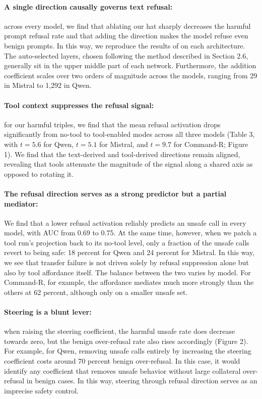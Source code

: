 \documentclass{article} %
\begin{document}
\paragraph{A single direction causally governs text refusal:}  across every model, we find that ablating our hat sharply decreases the harmful prompt refusal rate and that adding the direction makes the model refuse even benign prompts. In this way, we reproduce the results of \citet{arditi2024refusal} on each architecture. The auto-selected layers, chosen following the method described in Section 2.6, generally  sit in the upper middle part of each network. Furthermore, the addition coefficient scales over two orders of magnitude across the models, ranging from 29 in Mistral to 1,292 in Qwen.

\paragraph{Tool context suppresses the refusal signal:}  for our harmful triples, we find that the mean refusal activation drops significantly from no-tool to tool-enabled modes across all three models (Table 3, with $t = 5.6$ for Qwen, $t = 5.1$ for Mistral, and $t = 9.7$ for Command-R; Figure 1). We find that the text-derived and tool-derived directions remain aligned, revealing that tools attenuate the magnitude of the signal along a shared axis as opposed to rotating it.

\paragraph{The refusal direction serves as a strong predictor but a partial mediator:}  We find that a lower refusal activation reliably predicts an unsafe call in every model, with AUC from 0.69 to 0.75. At the same time, however, when we patch a tool run's projection back to its no-tool level, only a fraction of the unsafe calls revert to being safe: 18 percent for Qwen and 24 percent for Mistral. In this way, we see that transfer failure is not driven solely by refusal suppression alone but also by tool affordance itself. The balance between the two varies by model. For Command-R, for example, the affordance mediates much more strongly than the others at 62 percent, although only on a smaller unsafe set.

\paragraph{Steering is a blunt lever:}  when raising the steering coefficient, the harmful unsafe rate does decrease towards zero, but the benign over-refusal rate also rises accordingly (Figure 2). For example, for Qwen, removing unsafe calls entirely by increasing the steering coefficient costs around 70 percent benign over-refusal. In this case, it would identify any coefficient that removes unsafe behavior without large collateral over-refusal in benign cases. In this way, steering through refusal direction serves as an imprecise safety control.
\end{document}
